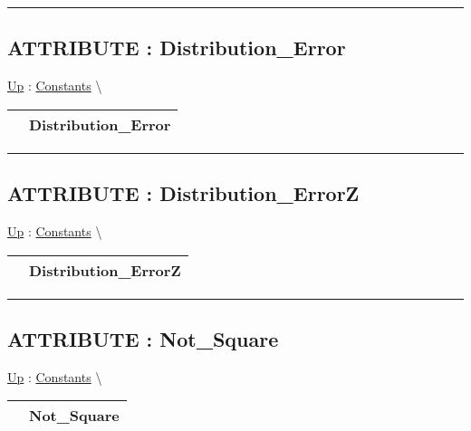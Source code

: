 \par


\rule{\linewidth}{0.5pt}
\subsection*{ATTRIBUTE : Distribution\_Error}
\hypertarget{ecldoc:pbblas.constants.distribution_error}{}
\hyperlink{ecldoc:PBblas.Constants}{Up} :
\hspace{0pt} \hyperlink{ecldoc:PBblas.Constants}{Constants} \textbackslash 

{\renewcommand{\arraystretch}{1.5}
\begin{tabularx}{\textwidth}{|>{\raggedright\arraybackslash}l|X|}
\hline
\hspace{0pt} & Distribution\_Error \\
\hline
\end{tabularx}
}

\par


\rule{\linewidth}{0.5pt}
\subsection*{ATTRIBUTE : Distribution\_ErrorZ}
\hypertarget{ecldoc:pbblas.constants.distribution_errorz}{}
\hyperlink{ecldoc:PBblas.Constants}{Up} :
\hspace{0pt} \hyperlink{ecldoc:PBblas.Constants}{Constants} \textbackslash 

{\renewcommand{\arraystretch}{1.5}
\begin{tabularx}{\textwidth}{|>{\raggedright\arraybackslash}l|X|}
\hline
\hspace{0pt} & Distribution\_ErrorZ \\
\hline
\end{tabularx}
}

\par


\rule{\linewidth}{0.5pt}
\subsection*{ATTRIBUTE : Not\_Square}
\hypertarget{ecldoc:pbblas.constants.not_square}{}
\hyperlink{ecldoc:PBblas.Constants}{Up} :
\hspace{0pt} \hyperlink{ecldoc:PBblas.Constants}{Constants} \textbackslash 

{\renewcommand{\arraystretch}{1.5}
\begin{tabularx}{\textwidth}{|>{\raggedright\arraybackslash}l|X|}
\hline
\hspace{0pt} & Not\_Square \\
\hline
\end{tabularx}
}

